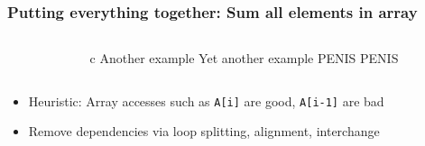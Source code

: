\documentclass[handout]{beamer}
\begin{document}
\begin{frame}[fragile]
  \frametitle{Putting everything together: Sum all elements in array}
  \begin{columns}[t]%
    \begin{column}{0.65\textwidth}
    \end{column}
    \pause
    \begin{column}{0.4\textwidth}
      \begin{ccode}[]
        {c}
        Another example
        Yet another example
        PENIS
        PENIS
      \end{ccode}
    \end{column}
  \end{columns}
  \pause
  \begin{itemize}
  \item Heuristic: Array accesses such as \texttt{A[i]} are good, \texttt{A[i-1]} are bad
  \item Remove dependencies via loop splitting, alignment, interchange
  \end{itemize}
\end{frame}
\end{document}
